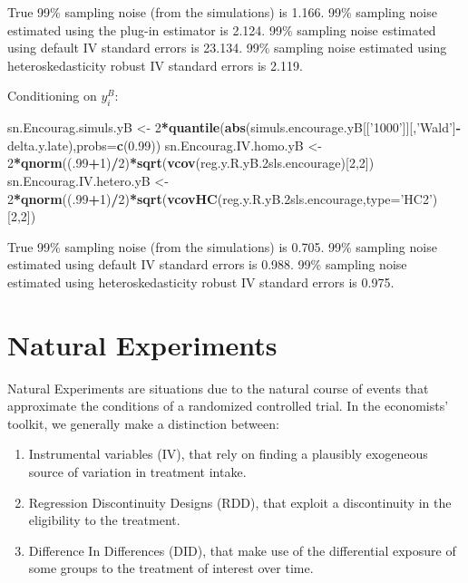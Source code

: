 \documentclass[]{book}
\newenvironment{Shaded}{\begin{snugshade}}{\end{snugshade}}
\newcommand{\KeywordTok}[1]{\textcolor[rgb]{0.13,0.29,0.53}{\textbf{#1}}}
\newcommand{\DataTypeTok}[1]{\textcolor[rgb]{0.13,0.29,0.53}{#1}}
\newcommand{\DecValTok}[1]{\textcolor[rgb]{0.00,0.00,0.81}{#1}}
\newcommand{\FloatTok}[1]{\textcolor[rgb]{0.00,0.00,0.81}{#1}}
\newcommand{\StringTok}[1]{\textcolor[rgb]{0.31,0.60,0.02}{#1}}
\newcommand{\OperatorTok}[1]{\textcolor[rgb]{0.81,0.36,0.00}{\textbf{#1}}}
\newcommand{\NormalTok}[1]{#1}
\providecommand{\tightlist}{%
  \setlength{\itemsep}{0pt}\setlength{\parskip}{0pt}}
\theoremstyle{definition}
\theoremstyle{definition}
\theoremstyle{definition}
\theoremstyle{remark}
\begin{document}
True 99\% sampling noise (from the simulations) is 1.166. 99\% sampling
noise estimated using the plug-in estimator is 2.124. 99\% sampling
noise estimated using default IV standard errors is 23.134. 99\%
sampling noise estimated using heteroskedasticity robust IV standard
errors is 2.119.

Conditioning on \(y_i^B\):

\begin{Shaded}
\begin{Highlighting}[]
\NormalTok{sn.Encourag.simuls.yB <-}\StringTok{ }\DecValTok{2}\OperatorTok{*}\KeywordTok{quantile}\NormalTok{(}\KeywordTok{abs}\NormalTok{(simuls.encourage.yB[[}\StringTok{'1000'}\NormalTok{]][,}\StringTok{'Wald'}\NormalTok{]}\OperatorTok{-}\NormalTok{delta.y.late),}\DataTypeTok{probs=}\KeywordTok{c}\NormalTok{(}\FloatTok{0.99}\NormalTok{))}
\NormalTok{sn.Encourag.IV.homo.yB <-}\StringTok{ }\DecValTok{2}\OperatorTok{*}\KeywordTok{qnorm}\NormalTok{((.}\DecValTok{99}\OperatorTok{+}\DecValTok{1}\NormalTok{)}\OperatorTok{/}\DecValTok{2}\NormalTok{)}\OperatorTok{*}\KeywordTok{sqrt}\NormalTok{(}\KeywordTok{vcov}\NormalTok{(reg.y.R.yB.2sls.encourage)[}\DecValTok{2}\NormalTok{,}\DecValTok{2}\NormalTok{])}
\NormalTok{sn.Encourag.IV.hetero.yB <-}\StringTok{ }\DecValTok{2}\OperatorTok{*}\KeywordTok{qnorm}\NormalTok{((.}\DecValTok{99}\OperatorTok{+}\DecValTok{1}\NormalTok{)}\OperatorTok{/}\DecValTok{2}\NormalTok{)}\OperatorTok{*}\KeywordTok{sqrt}\NormalTok{(}\KeywordTok{vcovHC}\NormalTok{(reg.y.R.yB.2sls.encourage,}\DataTypeTok{type=}\StringTok{'HC2'}\NormalTok{)[}\DecValTok{2}\NormalTok{,}\DecValTok{2}\NormalTok{])}
\end{Highlighting}
\end{Shaded}

True 99\% sampling noise (from the simulations) is 0.705. 99\% sampling
noise estimated using default IV standard errors is 0.988. 99\% sampling
noise estimated using heteroskedasticity robust IV standard errors is
0.975.

\chapter{Natural Experiments}\label{NE}

Natural Experiments are situations due to the natural course of events
that approximate the conditions of a randomized controlled trial. In the
economists' toolkit, we generally make a distinction between:

\begin{enumerate}
\def\labelenumi{\arabic{enumi}.}
\tightlist
\item
  Instrumental variables (IV), that rely on finding a plausibly
  exogeneous source of variation in treatment intake.
\item
  Regression Discontinuity Designs (RDD), that exploit a discontinuity
  in the eligibility to the treatment.
\item
  Difference In Differences (DID), that make use of the differential
  exposure of some groups to the treatment of interest over time.
\end{enumerate}
\end{document}
